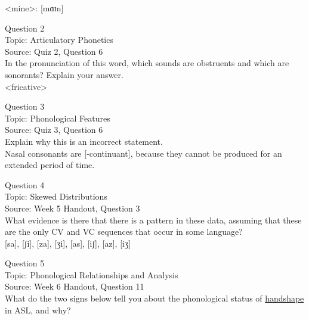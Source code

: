 \documentclass[12pt]{article}
\begin{document}
<mine>: {[mɑɪn]}


\newpage

{\large Question 2}\\

Topic: Articulatory Phonetics\\
Source: Quiz 2, Question 6\\

In the pronunciation of this word, which sounds are obstruents and which are sonorants? Explain your answer.\\

<fricative>


\newpage

{\large Question 3}\\

Topic: Phonological Features\\
Source: Quiz 3, Question 6\\

Explain why this is an incorrect statement.\\

Nasal consonants are {[-continuant]}, because they cannot be produced for an extended period of time.


\newpage

{\large Question 4}\\

Topic: Skewed Distributions\\
Source: Week 5 Handout, Question 3\\

What evidence is there that there is a pattern in these data, assuming that these are the only CV and VC sequences that occur in some language?\\

{[sa]}, {[ʃi]}, {[za]}, {[ʒi]}, {[as]}, {[iʃ]}, {[az]}, {[iʒ]}


\newpage

{\large Question 5}\\

Topic: Phonological Relationships and Analysis\\
Source: Week 6 Handout, Question 11\\

What do the two signs below tell you about the phonological status of \underline{handshape} in ASL, and why?\\
\end{document}
